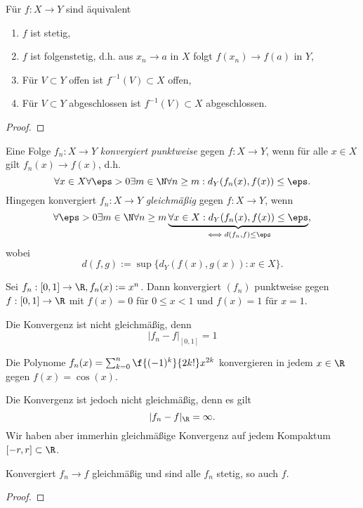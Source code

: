 \begin{st}
	Für $f: X \to Y$ sind äquivalent
	\begin{enumerate}[1)]
		\item
			$f$ ist stetig,
		\item
			$f$ ist folgenstetig, d.h. aus $x_n \to a$ in $X$ folgt $f(x_n) \to f(a)$ in $Y$,
		\item
			Für $V \subset Y$ offen ist $f^{-1}(V) \subset X$ offen,
		\item
			Für $V \subset Y$ abgeschlossen ist $f^{-1}(V) \subset X$ abgeschlossen.
	\end{enumerate}
	\begin{proof}
	\end{proof}
\end{st}

\begin{df}
	Eine Folge $f_n: X \to Y$ \emph{konvergiert punktweise} gegen $f: X \to Y$, wenn für alle $x \in X$ gilt $f_n(x) \to f(x)$, d.h.
	\[
		\forall x \in X \forall \eps > 0 \exists m \in \N \forall n \ge m : d_Y(f_n(x), f(x)) \le \eps.
	\]
	Hingegen konvergiert $f_n: X \to Y$ \emph{gleichmäßig} gegen $f: X \to Y$, wenn
	\[
		\forall \eps > 0 \exists m \in \N \forall n \ge m \underbrace{\forall x \in X : d_Y(f_n(x), f(x)) \le \eps}_{\iff d (f_n, f) \le \eps},
	\]
	wobei
	\[
		d(f,g)
		:= \sup \{ d_Y(f(x), g(x)) : x \in X \}.
	\]
\end{df}

\begin{ex}
	Sei $f_n : [0,1] \to \R, f_n(x) := x^n$.
	Dann konvergiert $(f_n)$ punktweise gegen $f:[0,1] \to \R$ mit $f(x) = 0$ für $0 \le x < 1$ und $f(x) = 1$ für $x=1$.

	Die Konvergenz ist nicht gleichmäßig, denn
	\[
		|f_n - f|_{[0,1]} = 1
	\]
\end{ex}

\begin{ex}
	Die Polynome $f_n(x) = \sum_{k=0}^n \f{(-1)^k}{2k!} x^{2k}$ konvergieren in jedem $x \in \R$ gegen $f(x) = \cos(x)$.

	Die Konvergenz ist jedoch nicht gleichmäßig, denn es gilt
	\[
		|f_n - f|_{\R} = \infty.
	\]
	Wir haben aber immerhin gleichmäßige Konvergenz auf jedem Kompaktum $[-r,r] \subset \R$.
\end{ex}

\begin{st}
	Konvergiert $f_n \to f$ gleichmäßig und sind alle $f_n$ stetig, so auch $f$.
	\begin{proof}
	\end{proof}
\end{st}

